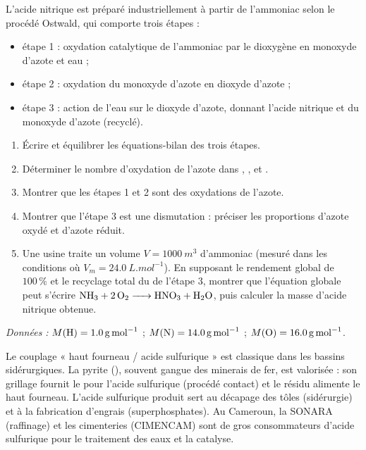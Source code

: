 \documentclass[11pt]{article}
\newcommand{\cle}[1]{{\popxbold\color{popdark}#1}}
\begin{document}
\begin{exercice}
L'acide nitrique  est préparé industriellement à partir de l'ammoniac  selon le procédé Ostwald, qui comporte trois étapes :
\begin{itemize}
\item étape 1 : oxydation catalytique de l'ammoniac par le dioxygène en monoxyde d'azote  et eau ;
\item étape 2 : oxydation du monoxyde d'azote en dioxyde d'azote  ;
\item étape 3 : action de l'eau sur le dioxyde d'azote, donnant l'acide nitrique et du monoxyde d'azote (recyclé).
\end{itemize}
\begin{enumerate}
\item Écrire et équilibrer les équations-bilan des trois étapes.
\item Déterminer le nombre d'oxydation de l'azote dans , ,  et .
\item Montrer que les étapes 1 et 2 sont des oxydations de l'azote.
\item Montrer que l'étape 3 est une \cle{dismutation} : préciser les proportions d'azote oxydé et d'azote réduit.
\item Une usine traite un volume $V = \SI{1000}{m^3}$ d'ammoniac (mesuré dans les conditions où $V_m = \SI{24,0}{L.mol^{-1}}$). En supposant le rendement global de $100\,\%$ et le recyclage total du  de l'étape 3, montrer que l'équation globale peut s'écrire $\ce{NH3 + 2 O2 -> HNO3 + H2O}$, puis calculer la masse d'acide nitrique obtenue.
\end{enumerate}
\emph{Données :} $M(\ce{H}) = \SI{1,0}{g.mol^{-1}}$ ; $M(\ce{N}) = \SI{14,0}{g.mol^{-1}}$ ; $M(\ce{O}) = \SI{16,0}{g.mol^{-1}}$.
\end{exercice}

\begin{savaistu}
Le couplage « haut fourneau / acide sulfurique » est classique dans les bassins sidérurgiques. La pyrite (), souvent gangue des minerais de fer, est valorisée : son grillage fournit le  pour l'acide sulfurique (procédé contact) et le résidu  alimente le haut fourneau. L'acide sulfurique produit sert au décapage des tôles (sidérurgie) et à la fabrication d'engrais (superphosphates). Au Cameroun, la SONARA (raffinage) et les cimenteries (CIMENCAM) sont de gros consommateurs d'acide sulfurique pour le traitement des eaux et la catalyse.
\end{savaistu}
\end{document}
